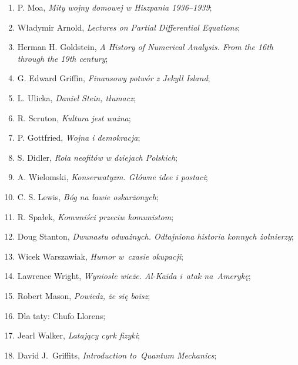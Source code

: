 \documentclass[a4paper,11pt]{article}
\begin{document}
\begin{enumerate}
\item P. Moa, \textit{Mity wojny domowej w Hiszpania 1936--1939};

\item Władymir Arnold, \textit{Lectures on Partial Differential
    Equations};

\item Herman H. Goldstein, \textit{A History of Numerical Analysis. From
    the 16th through the 19th century};

\item G. Edward Griffin, \textit{Finansowy potwór z Jekyll Island};

\item L. Ulicka, \textit{Daniel Stein, tłumacz};

\item R. Scruton, \textit{Kultura jest ważna};

\item P. Gottfried, \textit{Wojna i demokracja};

\item S. Didler, \textit{Rola neofitów w dziejach Polskich};

\item A. Wielomski, \textit{Konserwatyzm. Główne idee i postaci};

\item C. S. Lewis, \textit{Bóg na ławie oskarżonych};

\item R. Spałek, \textit{Komuniści przeciw komunistom};

\item Doug Stanton, \textit{Dwunastu odważnych. Odtajniona historia
    konnych żołnierzy};

\item Wicek Warszawiak, \textit{Humor w~czasie okupacji};

\item Lawrence Wright, \textit{Wyniosłe wieże. Al-Kaida i~atak
    na~Amerykę};

\item Robert Mason, \textit{Powiedz, że się boisz};

\item Dla taty: Chufo Llorens;

\item Jearl Walker, \textit{Latający cyrk fizyki};

\item David J.~Griffits, \textit{Introduction to~Quantum Mechanics};


\end{enumerate}
\end{document}
